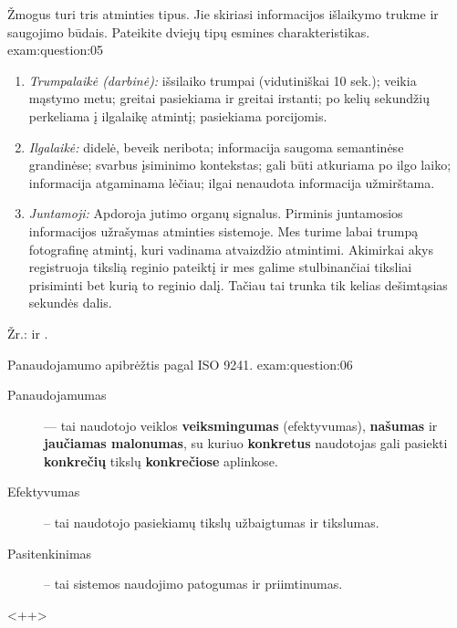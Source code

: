\begin{question}{%
  Žmogus turi tris atminties tipus. Jie skiriasi informacijos išlaikymo
  trukme ir saugojimo būdais. Pateikite dviejų tipų esmines
  charakteristikas.
  }{exam:question:05}
  \begin{enumerate}
    \item \emph{Trumpalaikė (darbinė):}
      išsilaiko trumpai (vidutiniškai 10 sek.); veikia mąstymo metu;
      greitai pasiekiama ir greitai irstanti; po kelių sekundžių
      perkeliama į ilgalaikę atmintį; pasiekiama porcijomis.
    \item \emph{Ilgalaikė:}
      didelė, beveik neribota; informacija saugoma semantinėse
      grandinėse; svarbus įsiminimo kontekstas; gali būti atkuriama
      po ilgo laiko; informacija atgaminama lėčiau; ilgai nenaudota
      informacija užmirštama.
    \item \emph{Juntamoji:}
      Apdoroja jutimo organų signalus. Pirminis juntamosios
      informacijos užrašymas atminties sistemoje. Mes turime labai
      trumpą fotografinę atmintį, kuri vadinama atvaizdžio
      atmintimi. Akimirkai akys registruoja tikslią reginio pateiktį
      ir mes galime stulbinančiai tiksliai prisiminti bet kurią to
      reginio dalį. Tačiau tai trunka tik kelias dešimtąsias
      sekundės dalis.
  \end{enumerate}
  Žr.: \cite[33--34]{konspektas} ir \cite[21--25]{skaidres-3}.
\end{question}

\begin{question}{%
  Panaudojamumo apibrėžtis pagal ISO 9241.
  }{exam:question:06}
  \begin{description}
    \item[Panaudojamumas] — tai naudotojo veiklos
      \textbf{veiksmingumas} (efektyvumas), \textbf{našumas} ir
      \textbf{jaučiamas malonumas}, su kuriuo \textbf{konkretus}
      naudotojas gali pasiekti \textbf{konkrečių} tikslų
      \textbf{konkrečiose} aplinkose.
    \item[Efektyvumas] – tai naudotojo pasiekiamų tikslų
      užbaigtumas ir tikslumas.
    \item[Pasitenkinimas] – tai sistemos naudojimo patogumas ir
      priimtinumas.
  \end{description}
  <++>
\end{question}

